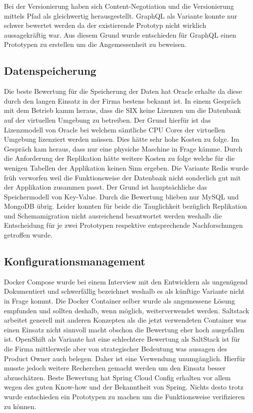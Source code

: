 Bei der Versionierung haben sich Content-Negotiation und die Versionierung mittels Pfad als gleichwertig herausgestellt. GraphQL als Variante konnte nur schwer bewertet werden da der existierende Prototyp nicht wirklich aussagekräftig war. Aus diesem Grund wurde entschieden für GraphQL einen Prototypen zu erstellen um die Angemessenheit zu beweisen.

\subsection{Datenspeicherung}

Die beste Bewertung für die Speicherung der Daten hat Oracle erhalte da diese durch den langen Einsatz in der Firma bestens bekannt ist. In einem Gespräch mit dem Betrieb kamm heraus, dass die SIX keine Lizenzen um die Datenbank auf der virtuellen Umgebung zu betreiben. Der Grund hierfür ist das Lizenzmodell von Oracle bei welchem sämtliche CPU Cores der virtuellen Umgebung lizenziert werden müssen. Dies hätte sehr hohe Kosten zu folge. Im Gespräch kam heraus, dass nur eine physiche Maschine in Frage kämme. 
Durch die Anforderung der Replikation hätte weitere Kosten zu folge welche für die wenigen Tabellen der Applikation keinen Sinn ergeben.
Die Variante Redis wurde früh verworfen weil die Funktionsweise der Datenbank nicht sonderlich gut mit der Applikation zusammen passt. Der Grund ist hauptsächliche das Speichermodell von Key-Value.
Durch die Bewertung blieben nur MySQL und MongoDB übrig. Leider konnten für beide die Tauglichkeit bezüglich Replikation und Schemamigration nicht ausreichend beantwortet werden weshalb die Entscheidung für je zwei Prototypen respektive entsprechende Nachforschungen getroffen wurde.

\subsection{Konfigurationsmanagement}

Docker Compose wurde bei einem Interview mit den Entwicklern als ungenügend Dokumentiert und schwerfällig bezeichnet weshalb es als künftige Variante nicht in Frage kommt. Die Docker Container selber wurde als angemessene Lösung empfunden und sollten deshalb, wenn möglich, weiterverwendet werden. Saltstack arbeitet generell mit anderen Konzepten als die jetzt verwendeten Container was einen Einsatz nicht sinnvoll macht obschon die Bewertung eher hoch ausgefallen ist. OpenShift als Variante hat eine schlechtere Bewertung als SaltStack ist für die Firma mittlerweile aber von strategischer Bedeutung was aussagen des Product Owner auch belegen. Daher ist eine Verwendung unumgänglich. Hierfür musste jedoch weitere Recherchen gemacht werden um den Einsatz besser abzuschätzen. Beste Bewertung hat Spring Cloud Config erhalten vor allem wegen des guten Know-how und der Bekanntheit von Spring. Nichts desto trotz wurde entschieden ein Prototypen zu machen um die Funktionsweise verifizieren zu können.

